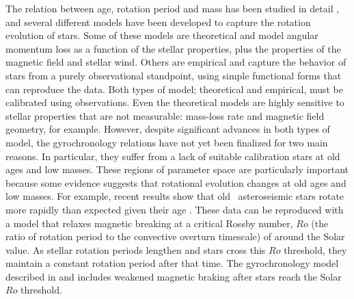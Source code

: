The relation between age, rotation period and mass has been studied in detail
, and several different models have been developed to
capture the rotation evolution of stars.
Some of these models are theoretical and model angular momentum loss as a
function of the stellar properties, plus the properties of the magnetic field
and stellar wind.
Others are empirical and capture the behavior of stars from a purely
observational standpoint, using simple functional forms that can reproduce the
data.
Both types of model; theoretical and empirical, must be calibrated using
observations.
Even the theoretical models are highly sensitive to stellar properties that
are not measurable: mass-loss rate and magnetic field geometry, for example.
However, despite significant advances in both types of model,
the gyrochronology relations have not yet been finalized for two main reasons.
In particular, they suffer from a lack of suitable calibration stars at old
ages and low masses.
These regions of parameter space are particularly important because some
evidence suggests that rotational evolution changes at old ages and low
masses.
For example, recent results show that old \kepler\ asteroseismic stars rotate
more rapidly than expected given their age \citep[\eg][]{Angus2015,
vansaders2016}.
These data can be reproduced with a model that relaxes magnetic breaking at a
critical Rossby number, $Ro$ (the ratio of rotation period to the convective
overturn timescale) of around the Solar value.
As stellar rotation periods lengthen and stars cross this $Ro$ threshold, they
maintain a constant rotation period after that time.
The gyrochronology model described in \citet{vansaders2016} and
\citet{vansaders2018} includes weakened magnetic braking after stars reach the
Solar $Ro$ threshold.

